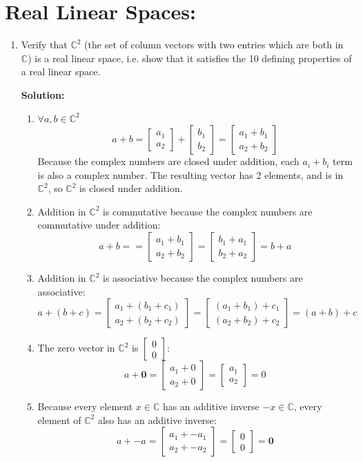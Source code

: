 \documentclass[]{article}
\newcommand{\C}{\mathbb{C}}
\newcommand{\bbm}{\begin{bmatrix}}
\newcommand{\ebm}{\end{bmatrix}}
\newcommand{\solution}{\vskip 0.5cm \textbf{\large Solution:} \\}
\begin{document}
    \section*{Real Linear Spaces:}

    \begin{enumerate}[resume]
	\item Verify that $\mathbb{C}^2$ (the set of column vectors with two entries which are both in $\mathbb{C}$) is a real linear space, i.e. show that it satisfies the 10 defining properties of a real linear space.

	  \solution
      \begin{enumerate}
      \item $\forall a,b \in \C^2$
        \[
        a + b = \bbm a_1 \\ a_2 \ebm + \bbm b_1 \\ b_2 \ebm = \bbm a_1 + b_1 \\ a_2 + b_2 \ebm
        \]
        Because the complex numbers are closed under addition, each
        $a_i + b_i$ term is also a complex number. The resulting
        vector has 2 elements, and is in $\C^2$, so $\C^2$ is closed
        under addition.
      \item Addition in $\C^2$ is commutative because the complex
        numbers are commutative under addition:
        \[
        a + b = = \bbm a_1 + b_1 \\ a_2 + b_2 \ebm = \bbm b_1 + a_1 \\ b_2 + a_2 \ebm = b + a
        \]
      \item Addition in $\C^2$ is associative because the complex
        numbers are associative:
        \[
        a + (b + c) = \bbm a_1 + (b_1 + c_1) \\ a_2 + (b_2 + c_2) \ebm = \bbm (a_1 + b_1) + c_1 \\ (a_2 + b_2) + c_2 \ebm = (a + b) + c
        \]
      \item The zero vector in $\C^2$ is $\bbm 0 \\ 0 \ebm$:
        \[
        a + \bm{0} = \bbm a_1 + 0 \\ a_2 + 0 \ebm  = \bbm a_1 \\ a_2 \ebm = 0
        \]
      \item Because every element $x \in \C$ has an additive inverse
        $-x \in \C$, every element of $\C^2$ also has an additive
        inverse:
        \[
        a + -a = \bbm a_1 + -a_1 \\ a_2 + -a_2 \ebm = \bbm 0 \\ 0 \ebm = \bm{0}
\]
\end{enumerate}
\end{enumerate}
\end{document}

